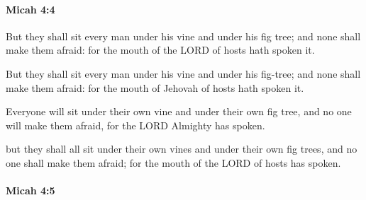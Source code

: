 		\paragraph{Micah 4:4} %
			\label{MICAH-4-4}

			But they shall sit every man under his vine and under his fig tree; and none shall make them afraid: for the mouth of the LORD of hosts hath spoken it.

			\begin{versebox}
					\item[BHS] 
					\item[LXX] 
					\item[ASV] But they shall sit every man under his vine and under his fig-tree; and none shall make them afraid: for the mouth of Jehovah of hosts hath spoken it.
					\item[NIV] Everyone will sit under their own vine and under their own fig tree, and no one will make them afraid, for the LORD Almighty has spoken.
					\item[NRSV] but they shall all sit under their own vines and under their own fig trees, and no one shall make them afraid; for the mouth of the LORD of hosts has spoken.
			\end{versebox}

		\paragraph{Micah 4:5} %
			\label{MICAH-4-5}

